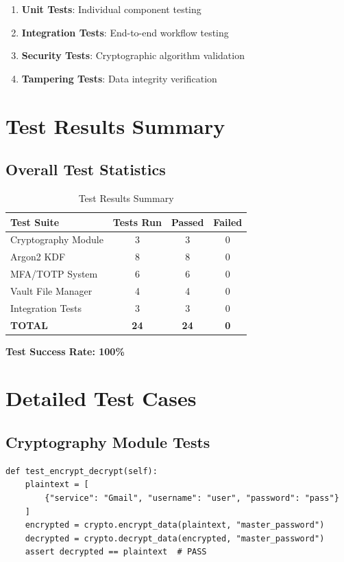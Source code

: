 \documentclass[12pt,a4paper]{report}
\begin{document}
\begin{enumerate}
    \item \textbf{Unit Tests}: Individual component testing
    \item \textbf{Integration Tests}: End-to-end workflow testing
    \item \textbf{Security Tests}: Cryptographic algorithm validation
    \item \textbf{Tampering Tests}: Data integrity verification
\end{enumerate}

\section{Test Results Summary}

\subsection{Overall Test Statistics}

\begin{table}[H]
\centering
\begin{tabular}{|l|c|c|c|}
\hline
\textbf{Test Suite} & \textbf{Tests Run} & \textbf{Passed} & \textbf{Failed} \\
\hline
Cryptography Module & 3 & 3 & 0 \\
Argon2 KDF & 8 & 8 & 0 \\
MFA/TOTP System & 6 & 6 & 0 \\
Vault File Manager & 4 & 4 & 0 \\
Integration Tests & 3 & 3 & 0 \\
\hline
\textbf{TOTAL} & \textbf{24} & \textbf{24} & \textbf{0} \\
\hline
\end{tabular}
\caption{Test Results Summary}
\end{table}

\textbf{Test Success Rate: 100\%}

\section{Detailed Test Cases}

\subsection{Cryptography Module Tests}

\begin{lstlisting}[caption=Test Case: Encrypt/Decrypt Cycle]
def test_encrypt_decrypt(self):
    plaintext = [
        {"service": "Gmail", "username": "user", "password": "pass"}
    ]
    encrypted = crypto.encrypt_data(plaintext, "master_password")
    decrypted = crypto.decrypt_data(encrypted, "master_password")
    assert decrypted == plaintext  # PASS
\end{lstlisting}
\end{document}
